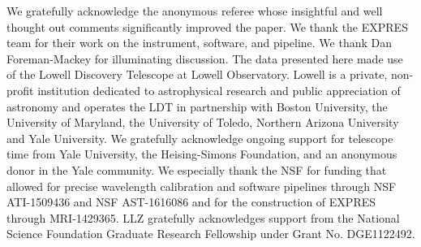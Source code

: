 \documentclass[twocolumn,table,xcolor,trackchanges]{aastex63}
\begin{document}


\acknowledgements
We  gratefully  acknowledge  the  anonymous  referee whose  insightful  and  well thought out  comments  significantly improved the paper.  We thank the EXPRES team for their work on the instrument, software, and pipeline.  We thank Dan Foreman-Mackey for illuminating discussion.  The data presented here made use of the Lowell Discovery Telescope at Lowell Observatory. Lowell is a private, non-profit institution dedicated to astrophysical research and public appreciation of astronomy and operates the LDT in partnership with Boston University, the University of Maryland, the University of Toledo, Northern Arizona University and Yale University. We gratefully acknowledge ongoing support for telescope time from Yale University, the Heising-Simons Foundation, and an anonymous donor in the Yale community. We especially thank the NSF for funding that allowed for precise wavelength calibration and software pipelines through NSF ATI-1509436 and NSF AST-1616086 and for the construction of EXPRES through MRI-1429365.  LLZ gratefully acknowledges support from the National Science Foundation Graduate Research Fellowship under Grant No. DGE1122492.


\end{document}
